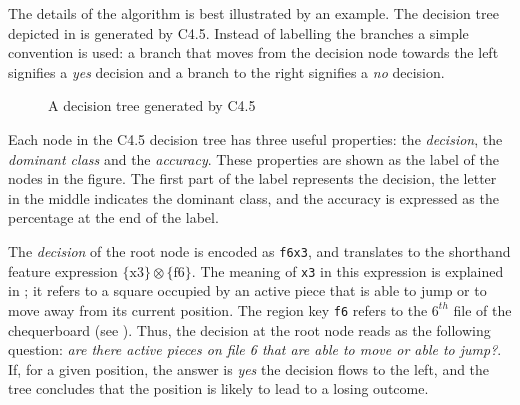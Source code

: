 The details of the algorithm is best illustrated by an example.  The decision tree depicted in  is generated by C4.5. Instead of labelling the branches a simple convention is used: a branch that moves from the decision node towards the left signifies a {\sl yes} decision and a branch to the right signifies a {\sl no} decision. 
\begin{figure} [htb]
\center
\tiny
{}
{
		{
				{
						{
								{
										{
												{
														{
																{
																		{
																				{
																						{
																						}
																				}
																		}
																}
														}
												}
										}
								}
						}
				}
		}
}
\caption{A decision tree generated by C4.5}
\label{fig:dec_tree}
\end{figure}
Each node in the C4.5 decision tree has three useful properties: the {\sl decision}, the {\sl dominant class} and the {\sl accuracy}.  These properties are shown as the label of the nodes in the figure.  The first part of the label represents the decision, the letter in the middle indicates the dominant class, and the accuracy is expressed as the percentage at the end of the label. 

The {\sl decision} of the root node is encoded as {\tt f6x3}, and translates to the shorthand feature expression 
$\{\mbox{x3}\} \otimes \{\mbox{f6}\}$. 
The meaning of {\tt x3} in this expression is explained in ;  it refers to a square occupied by an active piece that is able to jump or to move away from its current position. The region key {\tt f6} refers to the  $6^{th}$ file of the chequerboard (see ). Thus, the decision at the root node reads as the following question: {\it are there active pieces on file 6 that are able to move or able to jump?}.  If, for a given position, the answer is {\it yes} the decision flows to the left, and the tree concludes that the position is likely to lead to a losing outcome.  

